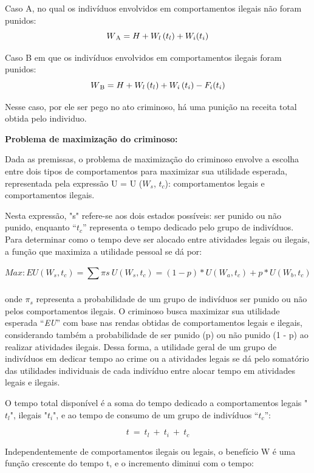 \documentclass[12pt]{article}
\begin{document}
Caso A, no qual os indivíduos envolvidos em comportamentos ilegais não
foram punidos:
\[W\textsubscript{A} = H + W_{l}\left( t_{l} \right) + W_{i}(t_{i})\]

Caso B em que os indivíduos envolvidos em comportamentos ilegais foram
punidos:
\[W\textsubscript{B} = H + W_{l}\left( t_{l} \right) + W_{i}\left( t_{i} \right) - F_{i}(t_{i})\]

Nesse caso, por ele ser pego no ato criminoso, há uma punição na receita
total obtida pelo individuo.

  
  \vspace*{1cm}
\textbf{Problema de maximização do criminoso:}

Dada as premissas, o problema de maximização do criminoso envolve a
escolha entre dois tipos de comportamentos para maximizar sua utilidade
esperada, representada pela expressão U = U (\(W_{s}\), \(t_{c}\)):
comportamentos legais e comportamentos ilegais.

Nesta expressão, "s" refere-se aos dois estados possíveis: ser punido
ou não punido, enquanto ``\(t_{c}\)'' representa o tempo dedicado pelo
grupo de indivíduos. Para determinar como o tempo deve ser alocado entre
atividades legais ou ilegais, a função que maximiza a utilidade pessoal
se dá por:

\[Max:EU\left( W_{s},t_{c} \right) = \sum_{}^{}{\pi s\ U(W_{s},t_{c})} = (1 - p)*U\left( W_{a},t_{c} \right) + p*U(W_{b},t_{c})\]

onde $\pi_s$ representa a probabilidade de um grupo de indivíduos
ser punido ou não pelos comportamentos ilegais. O criminoso busca
maximizar sua utilidade esperada ``\emph{EU}'' com base nas rendas
obtidas de comportamentos legais e ilegais, considerando também a
probabilidade de ser punido (p) ou não punido (1 - p) ao realizar
atividades ilegais. Dessa forma, a utilidade geral de um grupo de
indivíduos em dedicar tempo ao crime ou a atividades legais se dá pelo
somatório das utilidades individuais de cada indivíduo entre alocar
tempo em atividades legais e ilegais.

O tempo total disponível é a soma do tempo dedicado a comportamentos
legais "\(t_{l}\)", ilegais "\(t_{i}\)", e ao tempo de consumo de um
grupo de indivíduos ``\(t_{c}\)'':

\[t\  = \ t_{l}\  + \ t_{i}\  + \ t_{c}\]

Independentemente de comportamentos ilegais ou legais, o benefício W é
uma função crescente do tempo t, e o incremento diminui com o tempo:
\end{document}
